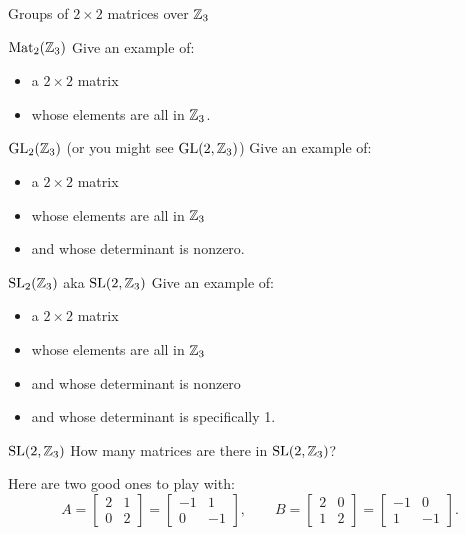 \documentclass[8pt, handout]{beamer}
\begin{document}
\begin{frame}{Groups of $2\times 2$ matrices over $\mathbb{Z}_3$} \pause

  \begin{exampleblock}{$\operatorname{Mat}_2(\mathbb{Z}_3)$}
    Give an example of:
    \begin{itemize}
      \item a $2\times 2$ matrix 
      \item whose elements are all in $\mathbb{Z}_3$.
    \end{itemize} 
    
  \end{exampleblock} \pause

  \begin{exampleblock}{$\operatorname{GL}_2(\mathbb{Z}_3)$ (or you might see $\operatorname{GL}(2, \mathbb{Z}_3)$)}
    Give an example of:
    \begin{itemize}
      \item a $2\times 2$ matrix 
      \item whose elements are all in $\mathbb{Z}_3$ \pause
      \item and whose determinant is nonzero.
    \end{itemize} 
  \end{exampleblock} \pause

  \begin{exampleblock}{$\operatorname{SL}_2(\mathbb{Z}_3)$ aka $\operatorname{SL}(2, \mathbb{Z}_3)$}
    Give an example of:
    \begin{itemize}
      \item a $2\times 2$ matrix 
      \item whose elements are all in $\mathbb{Z}_3$
      \item and whose determinant is nonzero \pause
      \item and whose determinant is specifically 1.
    \end{itemize} 
  \end{exampleblock}
  
\end{frame}


\begin{frame}{$\operatorname{SL}(2, \mathbb{Z}_3)$}
  How many matrices are there in $\operatorname{SL}(2, \mathbb{Z}_3)$? 

  \medskip \pause

  Here are two good ones to play with:
  \[
  A=\begin{bmatrix}2&1\\0&2\end{bmatrix}
  =\begin{bmatrix}-1&1\\0&-1\end{bmatrix},\qquad
  B=\begin{bmatrix}2&0\\1&2\end{bmatrix}
  =\begin{bmatrix}-1&0\\1&-1\end{bmatrix}. 
  \]
\end{frame}
\end{document}
